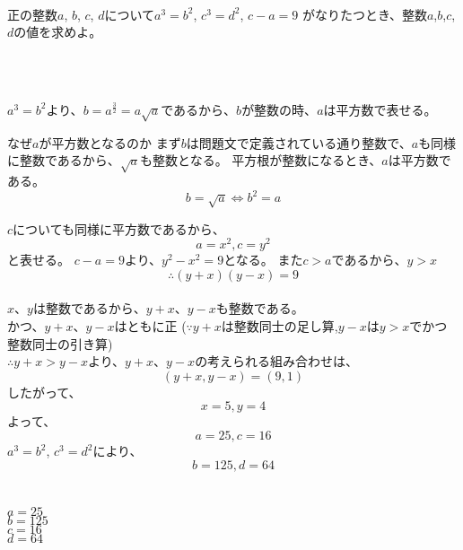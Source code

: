 \documentclass{jsarticle}
\begin{document}
  \begin{screen}
     \\
    正の整数$a$, $b$, $c$, $d$について$a^3=b^2$, $c^3=d^2$, $c-a=9$ がなりたつとき、整数$a$,$b$,$c$,$d$の値を求めよ。
  \end{screen}
  \\
  \dotfill

   \\
  $a^3=b^2$より、$b=a^\frac{3}{2}=a\sqrt{a}$であるから、$b$が整数の時、$a$は平方数で表せる。\\
  \begin{itembox}[l]{なぜ$a$が平方数となるのか}
    まず$b$は問題文で定義されている通り整数で、$a$も同様に整数であるから、$\sqrt{a}$も整数となる。
    平方根が整数になるとき、$a$は平方数である。
    \[b=\sqrt{a} \iff b^2=a\]
  \end{itembox}
  $c$についても同様に平方数であるから、
  \[a=x^2, c=y^2\]
  と表せる。
  $c-a=9$より、$y^2-x^2=9$となる。
  また$c>a$であるから、$y>x$\\
  \[\therefore (y+x)(y-x)=9\] \\
  $x$、$y$は整数であるから、$y+x$、$y-x$も整数である。\\
  かつ、$y+x$、$y-x$はともに正
  ($\because y+x$は整数同士の足し算,$y-x$は$y>x$でかつ整数同士の引き算)\\
  $\therefore y+x>y-x$より、$ y+x$、$y-x$の考えられる組み合わせは、\\
  \[(y+x, y-x)=(9,1)\]
  したがって、\\
  \[x=5, y=4\]
  よって、\\
  \[a=25, c=16\]
  $a^3=b^2$, $c^3=d^2$により、\\
  \[b=125, d=64\]
  \\
  \\
  $a=25$\\
  $b=125$\\
  $c=16$\\
  $d=64$\\
\end{document}
